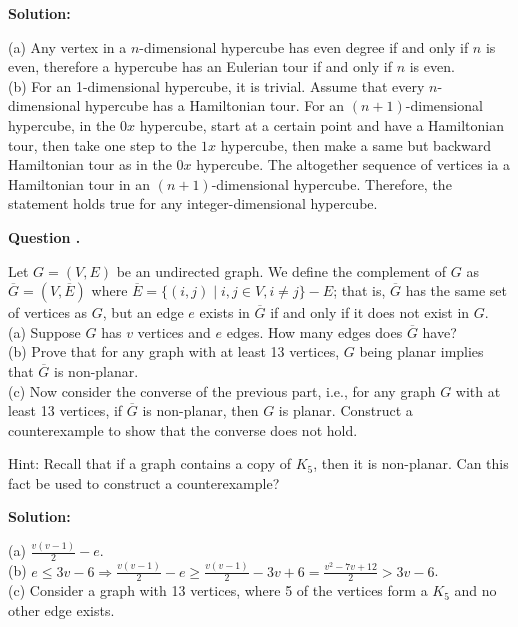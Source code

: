 \documentclass[12pt]{article}
\newcounter{questionnumber}
\newenvironment{question}[1][]{\stepcounter{questionnumber}\par\noindent\textbf{Question \thequestionnumber. #1}\par}{\par}
\newenvironment{solution}{\par\noindent\textbf{Solution:}\par}{\par\vspace{1em}}
\begin{document}
\begin{solution}
    \noindent
    (a) Any vertex in a $n$-dimensional hypercube has even degree if and only if $n$ is even, therefore a hypercube has an Eulerian tour if and only if $n$ is even.\\
    (b) For an 1-dimensional hypercube, it is trivial. Assume that every $n$-dimensional hypercube has a Hamiltonian tour.
    For an $(n+1)$-dimensional hypercube, in the $0x$ hypercube, start at a certain point and have a Hamiltonian tour, then take one step to the $1x$ hypercube, then make a same but backward Hamiltonian tour as in the $0x$ hypercube. The altogether sequence of vertices ia a Hamiltonian tour in an $(n+1)$-dimensional hypercube.
    Therefore, the statement holds true for any integer-dimensional hypercube.
\end{solution}
\begin{question}
    Let $G = (V,E)$ be an undirected graph. We define the complement of $G$ as $\overline{G} = (V,\overline{E})$ where $\overline{E} = \{(i,j) \mid i,j \in V, i \neq j\} - E$; that is, $\overline{G}$ has the same set of vertices as $G$, but an edge $e$ exists in $\overline{G}$ if and only if it does not exist in $G$.\\
    (a) Suppose $G$ has $v$ vertices and $e$ edges. How many edges does $\overline{G}$ have?\\
    (b) Prove that for any graph with at least 13 vertices, $G$ being planar implies that $\overline{G}$ is non-planar.\\
    (c) Now consider the converse of the previous part, i.e., for any graph $G$ with at least 13 vertices, if $\overline{G}$ is non-planar, then $G$ is planar. Construct a counterexample to show that the converse does not hold.

    Hint: Recall that if a graph contains a copy of $K_5$, then it is non-planar. Can this fact be used to construct a counterexample?
\end{question}
\begin{solution}
    \noindent
    (a) $\frac{v\left( v-1 \right)}{2}-e$.\\
    (b) $e\le 3v-6\Longrightarrow \frac{v\left( v-1 \right)}{2}-e\ge \frac{v\left( v-1 \right)}{2}-3v+6=\frac{v^2-7v+12}{2}>3v-6$.\\
    (c) Consider a graph with 13 vertices, where 5 of the vertices form a $K_5$ and no other edge exists.
\end{solution}
\end{document}
